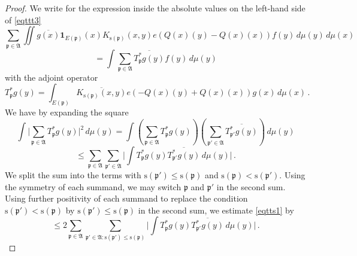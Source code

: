 \documentclass[10pt,a4paper]{article}
\theoremstyle{plain}
\theoremstyle{definition}
\numberwithin{equation}{subsection}
\newcommand{\fp}{{\mathfrak p}}
\newcommand{\ps}{{\mathrm{s}}}
\newcommand{\tQ}{{Q}}
\newcommand{\leanok}{}
\begin{document}
\begin{proof}
\leanok
We write for the expression inside the absolute values on the left-hand side of \eqref{eqttt3}
\begin{equation}
  \sum_{\fp \in \mathfrak{A}}\iint \overline{g(x)} \mathbf{1}_{E(\fp)}(x)
  {K_{\ps(\fp)}(x,y)}e(\tQ(x)(y) -
   \tQ(x)(x))
   f(y)\, d\mu(y)\,d\mu(x)
\end{equation}
\begin{equation}
  =\int \sum_{\fp \in \mathfrak{A}} \overline{T_{\fp} ^*g(y)} f(y)\, d\mu(y)
\end{equation}
with the adjoint operator
\begin{equation}\label{eq-tstarwritten}
    T_{\fp}^*g(y)=\int_{E(\fp)} \overline{K_{\ps(\fp)}(x,y)}e(-\tQ(x)(y)+
    \tQ(x)(x))g(x)\, d\mu(x)\, .
\end{equation}
We have by expanding the square
\begin{equation}
    \int \Big|\sum_{\fp\in \mathfrak{A}}T^*_{\fp}g(y)\Big|^2\, d\mu(y)=
    \int \left(\sum_{\fp\in \mathfrak{A}} T^*_{\fp}g(y)\right)
    \left(\sum_{\fp'\in \mathfrak{A}}\overline{T^*_{\fp'}g(y)}\right)\, d\mu(y)
\end{equation}
\begin{equation}\label{eqtts1}
    \le \sum_{\fp\in \mathfrak{A}} \sum_{\fp'\in \mathfrak{A}}
    \Big|\int T^*_{\fp}g(y)\overline{T^*_{\fp'}g(y)}\, d\mu(y)\Big|\,.
\end{equation}
We split the sum into the terms with $\ps(\fp')\le \ps(\fp)$
and $\ps(\fp)< \ps(\fp')$. Using the symmetry of each summand,
we may switch $\fp$ and $\fp'$ in the second sum. Using further positivity
of each summand to replace the condition $\ps(\fp')< \ps(\fp)$
by $\ps(\fp')\le \ps(\fp)$ in the second sum, we estimate \eqref{eqtts1} by
\begin{equation}\label{eqtts2}
    \le2 \sum_{\fp\in \mathfrak{A}} \sum_{\fp'\in \mathfrak{A}: \ps(\fp')\le \ps(\fp)}
    \Big|\int T^*_{\fp}g(y)\overline{T^*_{\fp'}g(y)}\, d\mu(y)\Big|\,.
\end{equation}


\end{proof}
\end{document}
